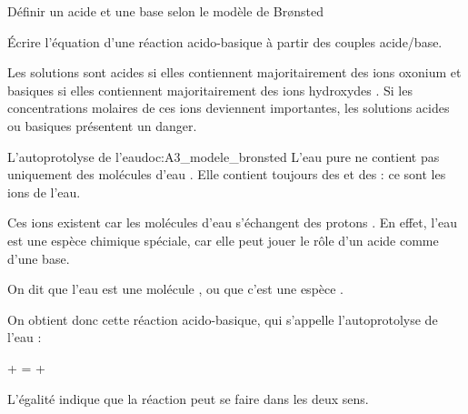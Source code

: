 \tetePremStssChim

\vspace*{-30pt}

\begin{objectifs}
  \item Définir un acide et une base selon le modèle de Br\o{}nsted
  \item Écrire l'équation d'une réaction acido-basique à partir des couples acide/base.
\end{objectifs}

\begin{contexte}
  Les solutions sont acides si elles contiennent majoritairement des ions oxonium \oxonium
  et basiques si elles contiennent majoritairement des ions hydroxydes \hydroxyde.
  Si les concentrations molaires de ces ions deviennent importantes, les solutions acides ou basiques présentent un danger.

\end{contexte}

\begin{doc}{L'autoprotolyse de l'eau}{doc:A3_modele_bronsted}
  L'eau pure ne contient pas uniquement des molécules d'eau \eau.
  Elle contient toujours des  \oxonium et des  \hydroxyde : ce sont les ions de l'eau.

  Ces ions existent car les molécules d'eau \eau s'échangent des protons \ionHydrogene.
  En effet, l'eau est une espèce chimique spéciale, car elle peut jouer le rôle d'un acide comme d'une base.
  \begin{importants}  
    On dit que l'eau est une molécule , ou que c'est une espèce .
  \end{importants}

  On obtient donc cette réaction acido-basique, qui s’appelle l’autoprotolyse de l’eau : 
  \begin{center}
    \eau +  = \oxonium + \hydroxyde
  \end{center}
  \attention L'égalité indique que la réaction peut se faire dans les deux sens.
\end{doc}





